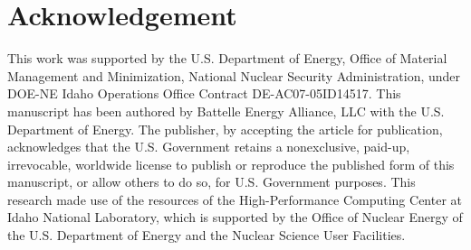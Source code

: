 \documentclass[review]{elsarticle}
\begin{document}
\section{Acknowledgement}
This work was supported by the U.S. Department of Energy, Office of Material Management and Minimization, National Nuclear Security Administration, under DOE-NE Idaho Operations Office Contract DE-AC07-05ID14517. This manuscript has been authored by Battelle Energy Alliance, LLC with the U.S. Department of Energy. The publisher, by accepting the article for publication, acknowledges that the U.S. Government retains a nonexclusive, paid-up, irrevocable, worldwide license to publish or reproduce the published form of this manuscript, or allow others to do so, for U.S. Government purposes. This research made use of the resources of the High-Performance Computing Center at Idaho National Laboratory, which is supported by the Office of Nuclear Energy of the U.S. Department of Energy and the Nuclear Science User Facilities.



\end{document}
